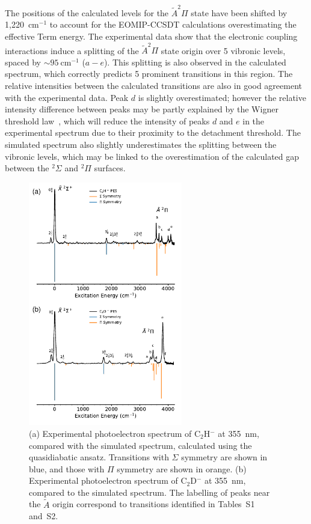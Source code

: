 \documentclass[journal=jpcafh,manuscript=article,layout=onecolumn, 12pt]{achemso}
\begin{document}
The positions of the calculated levels for the $\tilde{A}^2\Pi$ state have been shifted by 1,220~cm$^{-1}$ to account for the EOMIP-CCSDT calculations overestimating the effective Term energy. The experimental data show that the electronic coupling interactions induce a splitting of the $\tilde{A} ^2\Pi$ state origin over 5 vibronic levels, spaced by $\sim 95~$cm$^{-1}$ ($a-e$). This splitting is also observed in the calculated spectrum, which correctly predicts 5 prominent transitions in this region. The relative intensities between the calculated transitions are also in good agreement with the experimental data. Peak $d$ is slightly overestimated; however the relative intensity difference between peaks may be partly explained by the Wigner threshold law~\cite{wig48}, which will reduce the intensity of peaks $d$ and $e$ in the experimental spectrum due to their proximity to the detachment threshold. The simulated spectrum also slightly underestimates the splitting between the vibronic levels, which may be linked to the overestimation of the calculated gap between the $^2\Sigma$ and $^2\Pi$ surfaces.

\begin{figure}[th!]
	\includegraphics[width=0.6\textwidth]{figures/Fig5.pdf}
	\caption{(a) Experimental photoelectron spectrum of C$_2$H$^-$ at 355~nm, compared with the simulated spectrum, calculated using the quasidiabatic ansatz. Transitions with $\Sigma$ symmetry are shown in blue, and those with $\Pi$ symmetry are shown in orange. (b) Experimental photoelectron spectrum of C$_2$D$^-$ at 355~nm, compared to the simulated spectrum. The labelling of peaks near the $\tilde{A}$ origin correspond to transitions identified in Tables~S1 and~S2.}
	\label{fig:3}
\end{figure}
\end{document}
